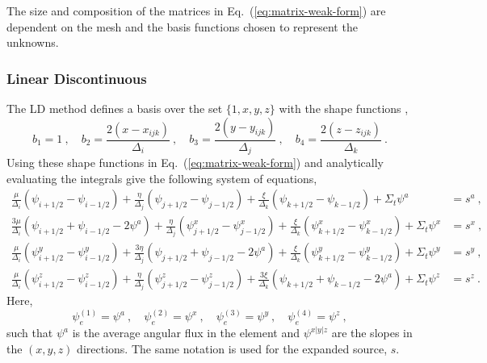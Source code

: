 \documentclass[12pt]{article}
\newcommand{\Di}{\ensuremath{\Delta_i}}
\newcommand{\Dj}{\ensuremath{\Delta_j}}
\newcommand{\Dk}{\ensuremath{\Delta_k}}
\begin{document}
The size and composition of the matrices in Eq.~(\ref{eq:matrix-weak-form})
are dependent on the mesh and the basis functions chosen to represent the
unknowns.  

\subsubsection*{Linear Discontinuous}
The LD method defines a basis over the set $\{1, x, y, z\}$ with
the shape functions \cite{adams_2001},
\begin{equation}
  b_1 = 1\:,\quad b_2 = \frac{2(x-x_{ijk})}{\Di}\:,\quad b_3 =
  \frac{2(y-y_{ijk})}{\Dj}\:,\quad b_4 = \frac{2(z-z_{ijk})}{\Dk}\:.
  \label{eq:ld_basis}
\end{equation}
Using these shape functions in Eq.~(\ref{eq:matrix-weak-form}) and
analytically evaluating the integrals give the following system of equations,
\begin{equation}
  \begin{aligned}
    \frac{\mu}{\Di}(\psi_{\scriptscriptstyle i+1/2}- \psi_{\scriptscriptstyle
      i-1/2}) + \frac{\eta}{\Dj}(\psi_{\scriptscriptstyle
      j+1/2}-\psi_{\scriptscriptstyle j-1/2}) +
    \frac{\xi}{\Dk}(\psi_{\scriptscriptstyle k+1/2}-\psi_{\scriptscriptstyle
      k-1/2})
    + \Sigma_t\psi^a &= s^a\:,\\
    \frac{3\mu}{\Di}(\psi_{\scriptscriptstyle i+1/2}+ \psi_{\scriptscriptstyle
      i-1/2}-2\psi^a) + \frac{\eta}{\Dj}(\psi_{\scriptscriptstyle
      j+1/2}^x-\psi_{\scriptscriptstyle j-1/2}^x) +
    \frac{\xi}{\Dk}(\psi_{\scriptscriptstyle k+1/2}^x-\psi_{\scriptscriptstyle
      k-1/2}^x) + \Sigma_t\psi^x &= s^x\:,\\
    \frac{\mu}{\Di}(\psi_{\scriptscriptstyle i+1/2}^y-\psi_{\scriptscriptstyle
      i-1/2}^y) + \frac{3\eta}{\Dj}(\psi_{\scriptscriptstyle
      j+1/2}+\psi_{\scriptscriptstyle j-1/2}-2\psi^a) +
    \frac{\xi}{\Dk}(\psi_{\scriptscriptstyle k+1/2}^y-\psi_{\scriptscriptstyle
      k-1/2}^y) + \Sigma_t\psi^y &= s^y\:,\\
    \frac{\mu}{\Di}(\psi_{\scriptscriptstyle i+1/2}^z-\psi_{\scriptscriptstyle
      i-1/2}^z) + \frac{\eta}{\Dj}(\psi_{\scriptscriptstyle
      j+1/2}^z-\psi_{\scriptscriptstyle j-1/2}^z) +
    \frac{3\xi}{\Dk}(\psi_{\scriptscriptstyle k+1/2}+\psi_{\scriptscriptstyle
      k-1/2}-2\psi^a) + \Sigma_t\psi^z &= s^z\:.
  \end{aligned}
  \label{eq:ld}
\end{equation}
Here,
\begin{equation}
  \psi_e^{(1)}=\psi^a\:,\quad\psi_e^{(2)}=\psi^x\:,\quad
  \psi_e^{(3)}=\psi^y\:,\quad\psi_e^{(4)}=\psi^z\:,
\end{equation}
such that $\psi^a$ is the average angular flux in the element and
$\psi^{x|y|z}$ are the slopes in the $(x,y,z)$ directions.  The same notation
is used for the expanded source, $s$.
\end{document}
